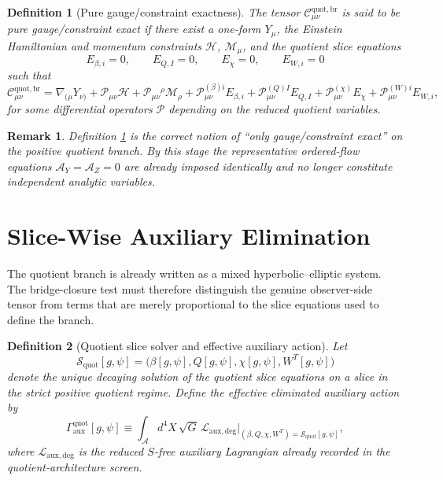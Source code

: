 \documentclass[11pt]{article}
\newcommand{\Sub}{\mathcal{A}}
\newcommand{\AY}{\mathcal A_Y}
\newcommand{\AZ}{\mathcal A_Z}
\newcommand{\BridgeCorr}{\mathcal C_{\mu\nu}^{\mathrm{quot,br}}}
\newcommand{\SliceSolve}{\mathscr S_{\mathrm{quot}}}
\newtheorem{definition}{Definition}
\newtheorem{remark}{Remark}
\begin{document}
\begin{definition}[Pure gauge/constraint exactness]
\label{def:pure}
The tensor \(\BridgeCorr\) is said to be \emph{pure gauge/constraint exact} if there exist a one-form \(Y_\mu\), the Einstein Hamiltonian and momentum constraints \(\mathcal H\), \(\mathcal M_\mu\), and the quotient slice equations
\[
E_{\beta,i}=0,
\qquad
E_{Q,I}=0,
\qquad
E_\chi=0,
\qquad
E_{W,i}=0
\]
such that
\begin{equation}
\BridgeCorr
=
\nabla_{(\mu}Y_{\nu)}
+ \mathcal P_{\mu\nu}\mathcal H
+ \mathcal P_{\mu\nu}{}^\rho\mathcal M_\rho
+ \mathcal P_{\mu\nu}^{(\beta)i}E_{\beta,i}
+ \mathcal P_{\mu\nu}^{(Q)I}E_{Q,I}
+ \mathcal P_{\mu\nu}^{(\chi)}E_\chi
+ \mathcal P_{\mu\nu}^{(W)i}E_{W,i},
\label{eq:pure}
\end{equation}
for some differential operators \(\mathcal P\) depending on the reduced quotient variables.
\end{definition}

\begin{remark}
Definition \ref{def:pure} is the correct notion of ``only gauge/constraint exact'' on the positive quotient branch. By this stage the representative ordered-flow equations \(\AY=\AZ=0\) are already imposed identically and no longer constitute independent analytic variables.
\end{remark}

\section{Slice-Wise Auxiliary Elimination}

The quotient branch is already written as a mixed hyperbolic--elliptic system. The bridge-closure test must therefore distinguish the genuine observer-side tensor from terms that are merely proportional to the slice equations used to define the branch.

\begin{definition}[Quotient slice solver and effective auxiliary action]
\label{def:solver}
Let
\[
\SliceSolve[g,\psi]
=
\bigl(\beta[g,\psi],Q[g,\psi],\chi[g,\psi],W^T[g,\psi]\bigr)
\]
denote the unique decaying solution of the quotient slice equations on a slice in the strict positive quotient regime. Define the \emph{effective eliminated auxiliary action} by
\begin{equation}
\Gamma_{\mathrm{aux}}^{\mathrm{quot}}[g,\psi]
\equiv
\int_{\Sub} d^4X\,\sqrt{G}\,
\mathcal L_{\mathrm{aux,deg}}
\Big|_{(\beta,Q,\chi,W^T)=\SliceSolve[g,\psi]},
\label{eq:Gamma}
\end{equation}
where \(\mathcal L_{\mathrm{aux,deg}}\) is the reduced \(S\)-free auxiliary Lagrangian already recorded in the quotient-architecture screen.
\end{definition}
\end{document}
